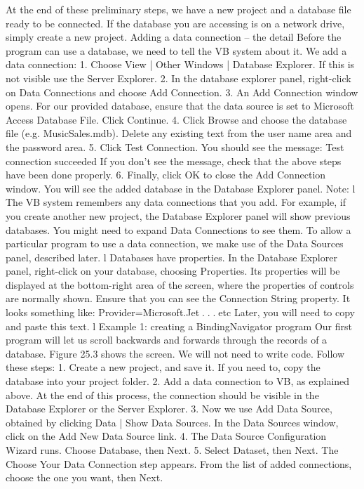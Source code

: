 At the end of these preliminary steps, we have a new project and a database ﬁle ready to be connected. If the database you are accessing is on a network drive, simply create a new project.
Adding a data connection – the detail
Before the program can use a database, we need to tell the VB system about it. We add a data connection:
1.	Choose View | Other Windows | Database Explorer. If this is not visible use the Server Explorer.
2.	In the database explorer panel, right-click on Data Connections and choose Add Connection.
3.	An Add Connection window opens. For our provided database, ensure that the data source is set to
	Microsoft Access Database File. Click Continue.
4.	Click Browse and choose the database ﬁle (e.g. MusicSales.mdb). Delete any existing text from the user name area and the password area.
5.	Click Test Connection. You should see the message:
		Test connection succeeded
	If you don’t see the message, check that the above steps have been done properly.
6.	Finally, click OK to close the Add Connection window. You will see the added database in the Database Explorer panel.
Note:
l	The VB system remembers any data connections that you add. For example, if 
you create another new project, the Database Explorer panel will show previous databases. You might need to expand Data Connections to see them. To allow 
a particular program to use a data connection, we make use of the Data Sources panel, described later.
l	Databases have properties. In the Database Explorer panel, right-click on your database, choosing Properties. Its properties will be displayed at the bottom-right area of the screen, where the properties of controls are normally shown. Ensure that you can see the Connection String property. It looks something like:
		Provider=Microsoft.Jet . . . etc
	Later, you will need to copy and paste this text.
l	Example 1: creating a BindingNavigator program
Our ﬁrst program will let us scroll backwards and forwards through the records of 
a database. Figure 25.3 shows the screen. We will not need to write code. Follow these steps:
1.	Create a new project, and save it. If you need to, copy the database into your project folder.
2.	Add a data connection to VB, as explained above. At the end of this process, the connection should be visible in the Database Explorer or the Server Explorer.
3.	Now we use Add Data Source, obtained by clicking Data | Show Data Sources. In the Data Sources window, click on the Add New Data Source link.
4.	The Data Source Conﬁguration Wizard runs. Choose Database, then Next.
5.	Select Dataset, then Next. The Choose Your Data Connection step appears. From the list of added connections, choose the one you want, then Next.
